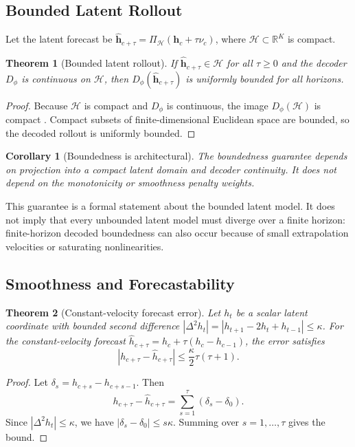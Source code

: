 \documentclass[a4paper,fleqn]{cas-sc}
\newtheorem{theorem}{Theorem}
\newtheorem{corollary}{Corollary}
\newcommand{\h}{\mathbf{h}}
\newcommand{\R}{\mathbb{R}}
\newcommand{\Hspace}{\mathcal{H}}
\begin{document}
\subsection{Bounded Latent Rollout}

Let the latent forecast be
$\hat{\h}_{c+\tau}=\Pi_{\Hspace}(\h_c+\tau\nu_c)$, where
$\Hspace\subset\R^K$ is compact.

\begin{theorem}[Bounded latent rollout]
\label{thm:bounded-rollout}
If $\hat{\h}_{c+\tau}\in\Hspace$ for all $\tau\geq0$ and the decoder
$D_\phi$ is continuous on $\Hspace$, then $D_\phi(\hat{\h}_{c+\tau})$ is
uniformly bounded for all horizons.
\end{theorem}

\begin{proof}
Because $\Hspace$ is compact and $D_\phi$ is continuous, the image
$D_\phi(\Hspace)$ is compact \citep{munkres2000topology}. Compact subsets of finite-dimensional Euclidean
space are bounded, so the decoded rollout is uniformly bounded.
\end{proof}

\begin{corollary}[Boundedness is architectural]
The boundedness guarantee depends on projection into a compact latent domain
and decoder continuity. It does not depend on the monotonicity or smoothness
penalty weights.
\end{corollary}

This guarantee is a formal statement about the bounded latent model. It does
not imply that every unbounded latent model must diverge over a finite horizon:
finite-horizon decoded boundedness can also occur because of small
extrapolation velocities or saturating nonlinearities.

\subsection{Smoothness and Forecastability}

\begin{theorem}[Constant-velocity forecast error]
\label{thm:smooth-forecast}
Let $h_t$ be a scalar latent coordinate with bounded second difference
$|\Delta^2h_t|=|h_{t+1}-2h_t+h_{t-1}|\leq \kappa$. For the
constant-velocity forecast
$\hat{h}_{c+\tau}=h_c+\tau(h_c-h_{c-1})$, the error satisfies
\[
    |h_{c+\tau}-\hat{h}_{c+\tau}|
    \leq
    \frac{\kappa}{2}\tau(\tau+1).
\]
\end{theorem}

\begin{proof}
Let $\delta_s=h_{c+s}-h_{c+s-1}$. Then
\[
    h_{c+\tau}-\hat{h}_{c+\tau}
    =
    \sum_{s=1}^{\tau}(\delta_s-\delta_0).
\]
Since $|\Delta^2h_t|\leq\kappa$, we have
$|\delta_s-\delta_0|\leq s\kappa$. Summing over $s=1,\ldots,\tau$ gives the
bound.
\end{proof}
\end{document}

